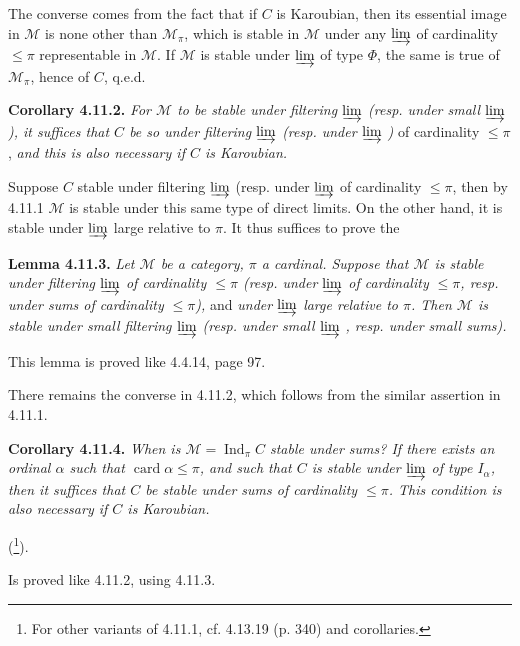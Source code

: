 \documentclass[11pt]{article}
\newcommand{\msp}[1]{\marginpar{\footnotesize [#1]}}
\newcommand{\Ind}{\operatorname{Ind}}
\begin{document}
The converse comes from the fact that if $C$ is Karoubian, then its essential image in $\mathcal{M}$ is none other than $\mathcal{M}_\pi$, which is stable in $\mathcal{M}$ under any $\varinjlim$ of cardinality $\leqslant \pi$ representable in $\mathcal{M}$. If $\mathcal{M}$ is stable under $\varinjlim$ of type $\Phi$, the same is true of $\mathcal{M}_\pi$, hence of $C$, q.e.d.

\textbf{Corollary 4.11.2.} \textit{For $\mathcal{M}$ to be stable under filtering $\varinjlim$ (resp. under small $\varinjlim$ ), it suffices that $C$ be so under filtering $\varinjlim$ (resp. under $\varinjlim$ )} of cardinality $\leqslant \pi$, \textit{and this is also necessary if $C$ is Karoubian.}

Suppose $C$ stable under filtering $\varinjlim$ \msp{page 270} (resp. under $\varinjlim$ of cardinality $\leqslant \pi$, then by 4.11.1 $\mathcal{M}$ is stable under this same type of direct limits. On the other hand, it is stable under $\varinjlim$ large relative to $\pi$. It thus suffices to prove the

\textbf{Lemma 4.11.3.} \textit{Let $\mathcal{M}$ be a category, $\pi$ a cardinal. Suppose that $\mathcal{M}$ is stable under filtering $\varinjlim$ of cardinality $\leqslant \pi$ (resp. under $\varinjlim$ of cardinality $\leqslant \pi$, resp. under sums of cardinality $\leqslant \pi$),} and \textit{under $\varinjlim$ large relative to $\pi$. Then $\mathcal{M}$ is stable under small filtering $\varinjlim$ (resp. under small $\varinjlim$ , resp. under small sums).} %

This lemma is proved like 4.4.14, page 97.

There remains the converse in 4.11.2, which follows from the similar assertion in 4.11.1.

\textbf{Corollary 4.11.4.} \textit{When is $\mathcal{M} = \Ind_\pi C$ stable under sums? If there exists an ordinal $\alpha$ such that $\operatorname{card}\alpha \leqslant \pi$, and such that $C$ is stable under $\varinjlim$ of type $I_\alpha$, then it suffices that $C$ be stable under sums of cardinality $\leqslant \pi$. This condition is also necessary if $C$ is Karoubian.}

(\footnote{For other variants of 4.11.1, cf. 4.13.19 (p. 340) and corollaries.}).

Is proved like 4.11.2, using 4.11.3.

\msp{page 271}
\end{document}
